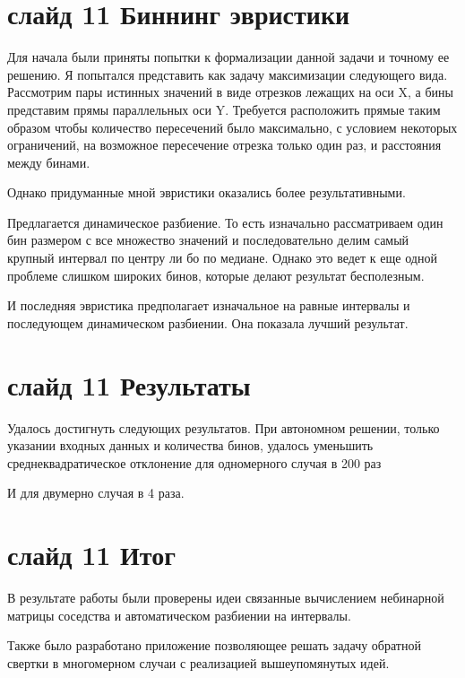 \documentclass[a4paper,12pt]{diplom}
\begin{document}
\section*{слайд 11 Биннинг эвристики}

Для начала были приняты попытки к формализации данной задачи и точному ее решению. Я попытался представить как задачу максимизации 
следующего вида. Рассмотрим пары истинных значений в виде отрезков лежащих на оси X, а бины представим прямы параллельных оси Y. 
Требуется расположить прямые таким образом чтобы количество пересечений было максимально, с условием некоторых ограничений, 
на возможное пересечение отрезка только один раз, и расстояния между бинами.

Однако придуманные мной эвристики оказались более результативными.

Предлагается динамическое разбиение. То есть изначально рассматриваем один бин размером с все множество значений и последовательно 
делим самый крупный интервал по центру ли бо по медиане. Однако это ведет к еще одной проблеме слишком широких бинов, которые делают 
результат бесполезным. 

И последняя эвристика предполагает изначальное на равные интервалы и последующем динамическом разбиении.
Она показала лучший результат.


\section*{слайд 11 Результаты}
Удалось достигнуть следующих результатов. При автономном решении, только указании входных данных и количества бинов, удалось 
уменьшить среднеквадратическое отклонение для одномерного случая в 200 раз

И для двумерно случая в 4 раза.


\section*{слайд 11 Итог}

В результате работы были проверены идеи связанные вычислением небинарной матрицы соседства и автоматическом разбиении на интервалы.

Также было разработано приложение позволяющее решать задачу обратной свертки в многомерном случаи с реализацией вышеупомянутых идей.
\end{document}
